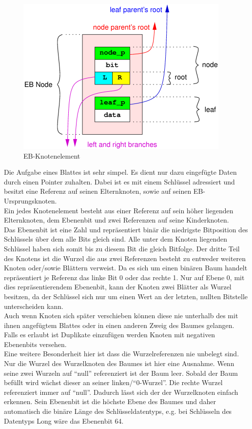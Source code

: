 \documentclass[a4paper,11pt,oneside,%
headsepline,												%
footsepline,												%
bibtotocnumbered									%
]{scrreprt}
\begin{document}
\begin{figure}
  \begin{center}
    \includegraphics[width=.6\linewidth]{bilder/Ebnode.png}
  \end{center}
 \caption{EB-Knotenelement}
\end{figure}
Die Aufgabe eines Blattes ist sehr simpel. Es dient nur dazu eingefügte Daten durch einen Pointer zuhalten. Dabei ist es mit einem Schlüssel adressiert und besitzt eine Referenz auf seinen Elternknoten, sowie auf seinen EB-Ursprungsknoten.\\
Ein jedes Knotenelement besteht aus einer Referenz auf sein höher liegenden Elternknoten, dem Ebenenbit  und zwei Referenzen auf seine Kinderknoten. \\ Das Ebenenbit ist eine Zahl und repräsentiert binär die niedrigste Bitposition des Schlüssels über dem alle Bits gleich sind. Alle unter dem Knoten liegenden Schlüssel haben sich somit bis zu diesem Bit die gleich Bitfolge. Der dritte Teil des Knotens ist die Wurzel die aus zwei Referenzen besteht zu entweder weiteren Knoten oder/sowie Blättern verweist. Da es sich um einen binären Baum handelt repräsentiert je Referenz das linke Bit 0 oder das rechte 1. Nur auf Ebene 0, mit dies repräsentierendem Ebenenbit, kann der Knoten zwei Blätter als Wurzel besitzen, da der Schlüssel sich nur um einen Wert an der letzten, nullten Bitstelle unterscheiden kann.\\
Auch wenn Knoten sich später verschieben können diese nie unterhalb des mit ihnen angefügtem Blattes oder in einen anderen Zweig des Baumes gelangen. Falls es erlaubt ist Duplikate einzufügen werden  Knoten mit negativen Ebenenbits versehen.\\
Eine weitere Besonderheit hier ist dass die Wurzelreferenzen nie unbelegt sind. Nur die Wurzel des Wurzelknoten des Baumes ist hier eine Ausnahme. Wenn seine zwei Wurzeln auf \enquote{null} referenziert ist der Baum leer. Sobald der Baum befüllt wird wächst dieser an seiner linken/\enquote{0-Wurzel}. Die rechte Wurzel referenziert immer auf \enquote{null}. Dadurch lässt sich der der Wurzelknoten einfach erkennen.
Sein Ebenenbit ist die höchste Ebene des Baumes und daher automatisch die binäre Länge des Schlüsseldatentyps, e.g. bei Schlüsseln des Datentyps Long wäre das Ebenenbit 64.\\
\end{document}
